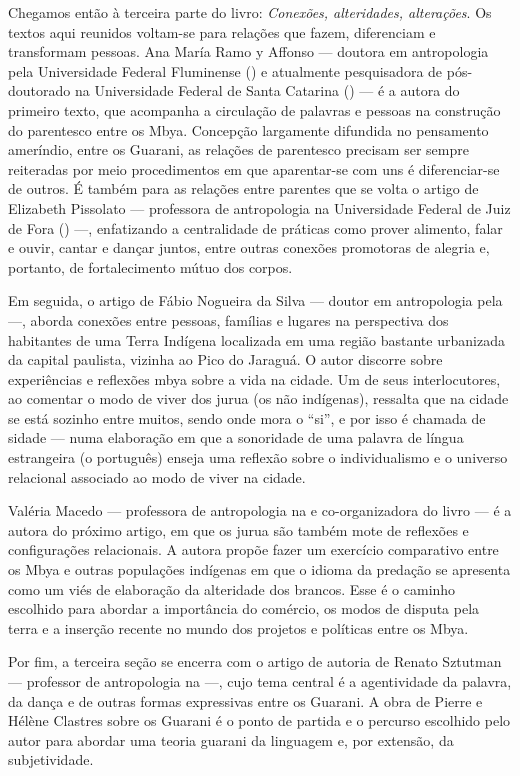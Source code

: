 Chegamos então à terceira parte do livro: \emph{Conexões, alteridades,
alterações}. Os textos aqui reunidos voltam-se para relações que fazem,
diferenciam e transformam pessoas. Ana María Ramo y Affonso — doutora
em antropologia pela Universidade Federal Fluminense () e atualmente
pesquisadora de pós-doutorado na Universidade Federal de Santa Catarina
()  — é a autora do primeiro texto, que acompanha a circulação de
palavras e pessoas na construção do parentesco entre os Mbya. Concepção
largamente difundida no pensamento ameríndio, entre os Guarani, as relações
de parentesco precisam ser sempre reiteradas por meio procedimentos em
que aparentar-se com uns é diferenciar-se de outros. É também para as
relações entre parentes que se volta o artigo de Elizabeth Pissolato —
professora de antropologia na Universidade Federal de Juiz de Fora
() —, enfatizando a centralidade de práticas como prover alimento,
falar e ouvir, cantar e dançar juntos, entre outras conexões promotoras
de alegria e, portanto, de fortalecimento mútuo dos corpos.

Em seguida, o artigo de Fábio Nogueira da Silva — doutor em antropologia
pela  —, aborda conexões entre pessoas, famílias e lugares na
perspectiva dos habitantes de uma Terra Indígena localizada em uma
região bastante urbanizada da capital paulista, vizinha ao Pico do
Jaraguá. O autor discorre sobre experiências e reflexões mbya sobre a
vida na cidade. Um de seus interlocutores, ao comentar o modo de viver
dos jurua (os não indígenas), ressalta que na cidade se está sozinho
entre muitos, sendo onde mora o ``si'', e por isso é chamada de sidade —
numa elaboração em que a sonoridade de uma palavra de língua
estrangeira (o português) enseja uma reflexão sobre o individualismo e
o universo relacional associado ao modo de viver na cidade.

Valéria Macedo — professora de antropologia na  e co-organizadora
do livro — é a autora do próximo artigo, em que os jurua são também
mote de reflexões e configurações relacionais. A autora propõe fazer um
exercício comparativo entre os Mbya e outras populações indígenas em
que o idioma da predação se apresenta como um viés de elaboração da
alteridade dos brancos. Esse é o caminho escolhido para abordar a
importância do comércio, os modos de disputa pela terra e a inserção
recente no mundo dos projetos e políticas entre os Mbya. 

Por fim, a terceira seção se encerra com o artigo de autoria de Renato
Sztutman — professor de antropologia na  —, cujo tema central é a
agentividade da palavra, da dança e de outras formas expressivas entre
os Guarani. A obra de Pierre e Hélène Clastres sobre os Guarani é o
ponto de partida e o percurso escolhido pelo autor para abordar uma
teoria guarani da linguagem e, por extensão, da subjetividade. 

